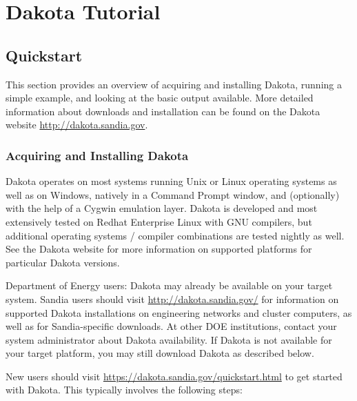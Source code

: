 \chapter{Dakota Tutorial}\label{tutorial}

\section {Quickstart}\label{tutorial:installation:quickstart}

This section provides an overview of acquiring and installing Dakota, 
running a simple example, and looking at the basic output available. 
More detailed information about downloads and installation can be found 
on the Dakota website \url{http://dakota.sandia.gov}.

\subsection {Acquiring and Installing Dakota}\label{tutorial:quickstart:installation}

Dakota operates on most systems running Unix or Linux operating
systems as well as on Windows, natively in a Command Prompt window,
and (optionally) with the help of a Cygwin emulation layer. Dakota
is developed and most extensively tested on Redhat Enterprise Linux
with GNU compilers, but additional operating systems
/ compiler combinations are tested nightly as well. See the Dakota
website for more information on supported platforms for particular
Dakota versions.

Department of Energy users: Dakota may already be available on your
target system. Sandia users should visit
\url{http://dakota.sandia.gov/} for information on supported Dakota
installations on engineering networks and cluster computers, as well
as for Sandia-specific downloads. At other DOE institutions, contact
your system administrator about Dakota availability. If Dakota is not
available for your target platform, you may still download Dakota as
described below.

New users should visit \url{https://dakota.sandia.gov/quickstart.html} to
get started with Dakota. This typically involves the following steps:

